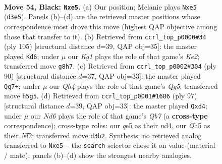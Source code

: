 \documentclass[11pt]{article}
\begin{document}
\clearpage

\begin{figure}[p]\centering
\begin{subfigure}{0.46\textwidth}\centering
\resizebox{\linewidth}{!}{%
\newchessgame
\chessboard[
  setfen={6k1/p7/1p6/4Qp1q/P1p5/3n2P1/1P4K1/R7 b - - 2 54},
  showmover=false,
  pgfstyle=straightmove, color=movearrow, markmove={d3-e5}
]}
\caption{}
\end{subfigure}\hfill
\begin{subfigure}{0.46\textwidth}\centering
\resizebox{\linewidth}{!}{%
\newchessgame
\chessboard[
  setfen={8/4k3/2q3p1/P6p/2p5/2Q3PP/5P2/5K2 b - - 0 53},
  showmover=false,
  pgfstyle=straightmove, color=movearrow, markmove={e7-d6}
]}
\caption{}
\end{subfigure}
\\[4pt]
\begin{subfigure}{0.46\textwidth}\centering
\resizebox{\linewidth}{!}{%
\newchessgame
\chessboard[
  setfen={8/3k4/3p4/ppqP2Q1/8/1P6/2P5/1K6 w - - 0 46},
  showmover=false,
  pgfstyle=straightmove, color=movearrow, markmove={g5-g7}
]}
\caption{}
\end{subfigure}\hfill
\begin{subfigure}{0.46\textwidth}\centering
\resizebox{\linewidth}{!}{%
\newchessgame
\chessboard[
  setfen={8/6pk/7p/5p1Q/P2N1P2/7P/1q3nPK/8 b - - 2 49},
  showmover=false,
  pgfstyle=straightmove, color=movearrow, markmove={b2-d4}
]}
\caption{}
\end{subfigure}
\caption{\textbf{Move 54, Black: \texttt{Nxe5}.} (a) Our position; Melanie plays \texttt{Nxe5} (\texttt{d3e5}). Panels (b)--(d) are the retrieved master positions whose correspondence most drove this move (highest QAP objective among those that transfer to it). (b) Retrieved from \texttt{ccrl\_top\_p0000\#34} (ply 105) [structural distance $d$=39, QAP obj=35]: the master played \texttt{Kd6}; under $\mu$ our \emph{Kg1} plays the role of that game's \emph{Ke2}; transferred move \texttt{g8h7}. (c) Retrieved from \texttt{ccrl\_top\_p0002\#304} (ply 90) [structural distance $d$=37, QAP obj=33]: the master played \texttt{Qg7+}; under $\mu$ our \emph{Qh4} plays the role of that game's \emph{Qg5}; transferred move \texttt{h5g5}. (d) Retrieved from \texttt{ccrl\_top\_p0001\#1686} (ply 97) [structural distance $d$=39, QAP obj=33]: the master played \texttt{Qxd4}; under $\mu$ our \emph{Nd6} plays the role of that game's \emph{Qb7} (a \textbf{cross-type} correspondence); cross-type roles: our \emph{q}e5 as their \emph{n}d4, our \emph{Q}h5 as their \emph{N}f2; transferred move \texttt{d3b2}. Synthesis: no retrieved analog transferred to \texttt{Nxe5} -- the \texttt{search} selector chose it on value (material / mate); panels (b)--(d) show the strongest nearby analogies.}
\label{fig:thought-m107}
\end{figure}
\end{document}
